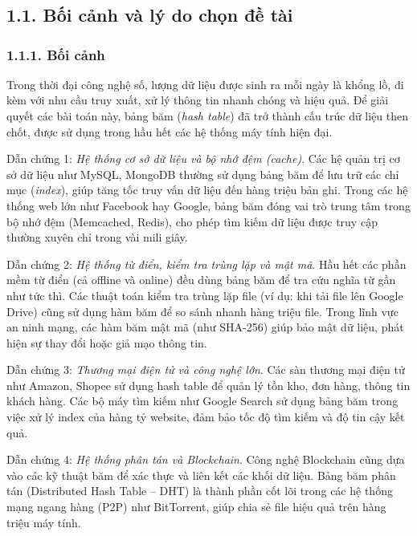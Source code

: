 \documentclass[12pt,a4paper]{report}
\begin{document}
\newpage
\chapter*{}

\section*{1.1. Bối cảnh và lý do chọn đề tài}
\subsection*{1.1.1. Bối cảnh}
\noindent \indent Trong thời đại công nghệ số, lượng dữ liệu được sinh ra mỗi ngày là khổng lồ, đi kèm với nhu cầu truy xuất, xử lý thông tin nhanh chóng và hiệu quả. Để giải quyết các bài toán này, bảng băm (\textit{hash table}) đã trở thành cấu trúc dữ liệu then chốt, được sử dụng trong hầu hết các hệ thống máy tính hiện đại.

Dẫn chứng 1: \textit{Hệ thống cơ sở dữ liệu và bộ nhớ đệm (\textit{cache})}.
Các hệ quản trị cơ sở dữ liệu như MySQL, MongoDB thường sử dụng bảng băm để lưu trữ các chỉ mục (\textit{index}), giúp tăng tốc truy vấn dữ liệu đến hàng triệu bản ghi. Trong các hệ thống web lớn như Facebook hay Google, bảng băm đóng vai trò trung tâm trong bộ nhớ đệm (Memcached, Redis), cho phép tìm kiếm dữ liệu được truy cập thường xuyên chỉ trong vài mili giây.

Dẫn chứng 2: \textit{Hệ thống từ điển, kiểm tra trùng lặp và mật mã}.
Hầu hết các phần mềm từ điển (cả offline và online) đều dùng bảng băm để tra cứu nghĩa từ gần như tức thì. Các thuật toán kiểm tra trùng lặp file (ví dụ: khi tải file lên Google Drive) cũng sử dụng hàm băm để so sánh nhanh hàng triệu file. Trong lĩnh vực an ninh mạng, các hàm băm mật mã (như SHA-256) giúp bảo mật dữ liệu, phát hiện sự thay đổi hoặc giả mạo thông tin.

Dẫn chứng 3: \textit{Thương mại điện tử và công nghệ lớn}.
Các sàn thương mại điện tử như Amazon, Shopee sử dụng hash table để quản lý tồn kho, đơn hàng, thông tin khách hàng. Các bộ máy tìm kiếm như Google Search sử dụng bảng băm trong việc xử lý index của hàng tỷ website, đảm bảo tốc độ tìm kiếm và độ tin cậy kết quả.

Dẫn chứng 4: \textit{Hệ thống phân tán và Blockchain}.
Công nghệ Blockchain cũng dựa vào các kỹ thuật băm để xác thực và liên kết các khối dữ liệu. Bảng băm phân tán (Distributed Hash Table – DHT) là thành phần cốt lõi trong các hệ thống mạng ngang hàng (P2P) như BitTorrent, giúp chia sẻ file hiệu quả trên hàng triệu máy tính.
\end{document}
